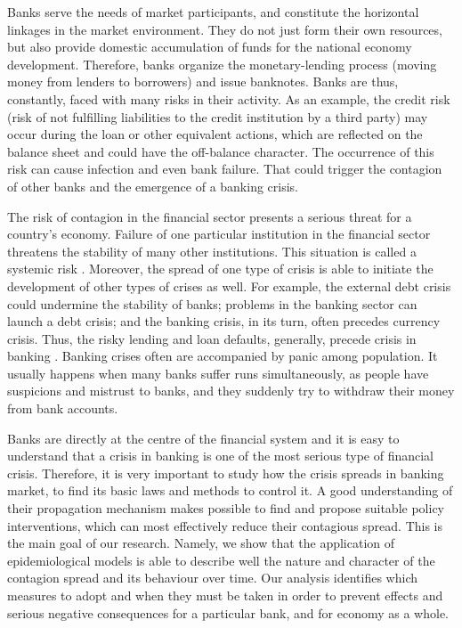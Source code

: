 \documentclass[a4paper,10pt,twoside]{article}
\begin{document}
Banks serve the needs of market participants, and constitute the horizontal 
linkages in the market environment. They do not just form their own resources, 
but also provide domestic accumulation of funds for the national economy development. 
Therefore, banks organize the monetary-lending process (moving money from lenders 
to borrowers) and issue banknotes. Banks are thus, constantly, faced with many 
risks in their activity. As an example, the credit risk (risk of not fulfilling 
liabilities to the credit institution by a third party) may occur during the 
loan or other equivalent actions, which are reflected on the balance sheet 
and could have the off-balance character. The occurrence of this risk can cause 
infection and even bank failure. That could trigger the contagion of other banks 
and the emergence of a banking crisis.
		
The risk of contagion in the financial sector presents a serious threat 
for a country's economy. Failure of one particular institution in the 
financial sector threatens the stability of many other institutions. 
This situation is called a systemic risk \cite{[23]}. Moreover, 
the spread of one type of crisis is able to initiate the development 
of other types of crises as well. For example, the external debt crisis 
could undermine the stability of banks; problems in the banking sector 
can launch a debt crisis; and the banking crisis, in its turn, often 
precedes currency crisis. Thus, the risky lending and loan defaults, 
generally, precede crisis in banking \cite{[22]}. Banking crises often 
are accompanied by panic among population. It usually happens when 
many banks suffer runs simultaneously, as people have suspicions 
and mistrust to banks, and they suddenly try to withdraw 
their money from bank accounts.
		
Banks are directly at the centre of the financial system and it is easy 
to understand that a crisis in banking is one of the most serious 
type of financial crisis. Therefore, it is very important to study 
how the crisis spreads in banking market, to find its basic laws 
and methods to control it. A good understanding of their propagation 
mechanism makes possible to find and propose suitable policy interventions, 
which can most effectively reduce their contagious spread. This is the 
main goal of our research. Namely, we show that the application 
of epidemiological models is able to describe well the nature 
and character of the contagion spread and its behaviour over time. 
Our analysis identifies which measures to adopt and when they must 
be taken in order to prevent effects and serious negative consequences 
for a particular bank, and for economy as a whole.
		
\end{document}
